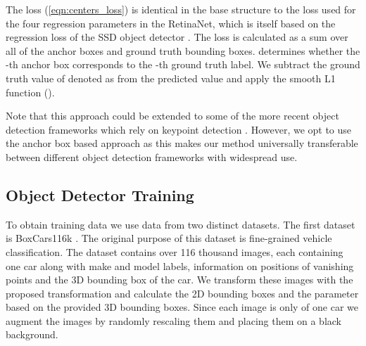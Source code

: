 \documentclass[twocolumn]{svjour3}          \smartqed  \usepackage{graphicx}
\begin{document}
The loss  (\ref{eqn:centers_loss}) is identical in the base structure to the loss used for the four regression parameters in the RetinaNet, which is itself based on the regression loss of the SSD object detector \cite{SSD}. The loss is calculated as a sum over all of the  anchor boxes and  ground truth bounding boxes.  determines whether the -th anchor box corresponds to the -th ground truth label. We subtract the ground truth value of  denoted as  from the predicted value  and apply the smooth L1 function ().



Note that this approach could be extended to some of the more recent object detection frameworks which rely on keypoint detection \cite{CornerNet,ObjectsAsPoints}. However, we opt to use the anchor box based approach as this makes our method universally transferable between different object detection frameworks with widespread use. 

\subsection{Object Detector Training}

To obtain training data we use data from two distinct datasets. The first dataset is BoxCars116k \cite{boxcars}. The original purpose of this dataset is fine-grained vehicle classification. The dataset contains over 116 thousand images, each containing one car along with make and model labels, information on positions of vanishing points and the 3D bounding box of the car. We transform these images with the proposed transformation and calculate the 2D bounding boxes and the  parameter based on the provided 3D bounding boxes. Since each image is only of one car we augment the images by randomly rescaling them and placing them on a black background.

\label{sec:BCS}
\end{document}
